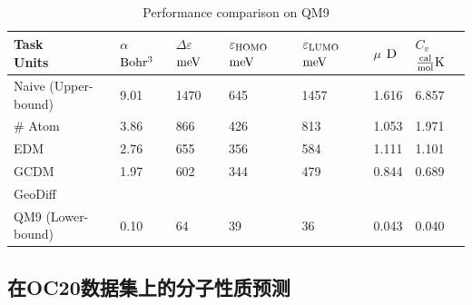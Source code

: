 \begin{table}[h]
    \centering
    \caption{Performance comparison on QM9}
    \label{tab:exp_qm9_reg}
    \begin{tabular}{lllllll}
    \hline
    \makecell[l]{Task\\Units} & \makecell[l]{$\alpha$\\${\rm Bohr^3}$} & \makecell[l]{$\Delta \varepsilon$\\${\rm meV}$} & \makecell[l]{$\varepsilon_{{\rm HOMO}}$\\${\rm meV}$} & \makecell[l]{$\varepsilon_{{\rm LUMO}}$\\${\rm meV}$} & \makecell[l]{$\mu$\\${\rm D}$} & \makecell[l]{$C_v$\\$\frac{{\rm cal}}{{\rm mol}}{\rm K}$} \\
    \hline
    Naive (Upper-bound) & 9.01 & 1470 & 645 & 1457 & 1.616 & 6.857 \\
    \# Atom & 3.86 & 866 & 426 & 813 & 1.053 & 1.971 \\
    EDM & 2.76 & 655 & 356 & 584 & 1.111 & 1.101 \\
    GCDM & 1.97 & 602 & 344 & 479 & 0.844 & 0.689 \\
    GeoDiff &  &  &  &  &  & \\
    QM9 (Lower-bound) & 0.10 & 64 & 39 & 36 & 0.043 & 0.040 \\
    \hline
    \end{tabular}
\end{table}

\subsection{在OC20数据集上的分子性质预测}
